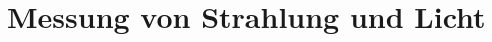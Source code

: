 \section{Messung von Strahlung und Licht}
\begin{frame}
    \frametitle{\insertsection}

    

\end{frame}